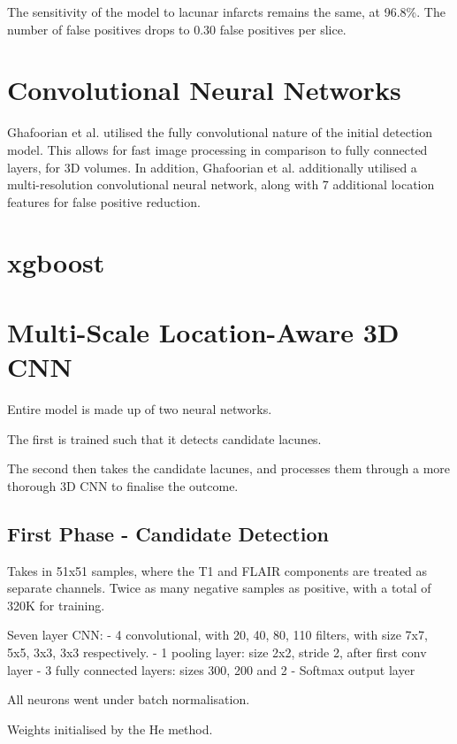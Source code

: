 The sensitivity of the model to lacunar infarcts remains the same, at 96.8\%. The number of false positives drops to 0.30 false positives per slice.

\section{Convolutional Neural Networks}
 
Ghafoorian et al. \cite{GhafoorianM.2017Dml3} utilised the fully convolutional nature of the initial detection model. This allows for fast image processing in comparison to fully connected layers, for 3D volumes. In addition, Ghafoorian et al. additionally utilised a multi-resolution convolutional neural network, along with 7 additional location features for false positive reduction.

\section{xgboost}

\section{Multi-Scale Location-Aware 3D CNN}\label{litrev-ghafoorian}

Entire model is made up of two neural networks.

The first is trained such that it detects candidate lacunes.

The second then takes the candidate lacunes, and processes them through a more thorough 3D CNN to finalise the outcome.

\subsection{First Phase - Candidate Detection}

Takes in 51x51 samples, where the T1 and FLAIR components are treated as separate channels. Twice as many negative samples as positive, with a total of 320K for training.

Seven layer CNN:
- 4 convolutional, with 20, 40, 80, 110 filters, with size 7x7, 5x5, 3x3, 3x3 respectively.
- 1 pooling layer: size 2x2, stride 2, after first conv layer
- 3 fully connected layers: sizes 300, 200 and 2
- Softmax output layer

All neurons went under batch normalisation.

Weights initialised by the He method.

